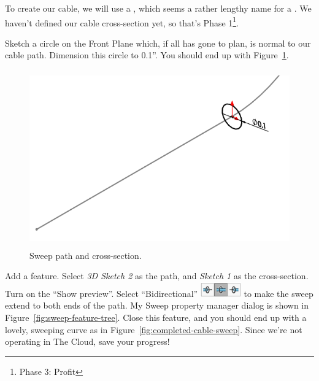 \label{sec:cable_sweep}
To create our cable, we will use a  , which seems a rather
lengthy name for a . We haven't defined our cable cross-section yet, so
that's Phase 1\footnote{Phase 3: Profit}.

Sketch a circle on the Front Plane which, if all has gone to plan, is normal to
our cable path. Dimension this circle to 0.1''. You should end up
with Figure~\ref{fig:sweep-cross-section}.

\begin{figure}[H]
\begin{center}
  \includegraphics[height=3in]{images/figures/sweep-cross-section.png}
\end{center}
\caption{Sweep path and cross-section.
\label{fig:sweep-cross-section}}

\end{figure}

Add a  feature. Select \emph{3D Sketch 2} as the path, and \emph{Sketch 1} as the
cross-section. Turn on the ``Show preview''. Select ``Bidirectional'' \includegraphics{images/symbols/bidirectional-sweep.png} to make the sweep extend to
both ends of the path. My Sweep property manager dialog is shown in Figure~\ref{fig:sweep-feature-tree}. Close this feature, and you should end up with a
lovely, sweeping curve as in Figure~\ref{fig:completed-cable-sweep}. Since we're not operating in The Cloud, save your progress!

